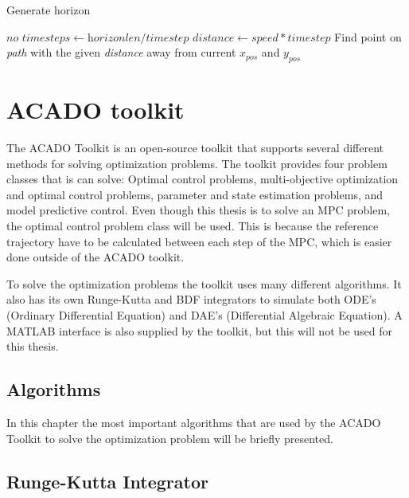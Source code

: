 \begin{algorithm}
\caption{Generate horizon}
\label{alg:genHor}
\begin{algorithmic}
	\State $\textit{no timesteps} \gets \textit{horizonlen}/\textit{timestep}$
	\State $\textit{distance} \gets \textit{speed} * \textit{timestep}$
		Find point on \textit{path} with the given \textit{distance} away from current \textit{$x_{pos}$} and \textit{$y_{pos}$}
	\EndFor
\EndProcedure
\end{algorithmic}
\end{algorithm}


\section{ACADO toolkit}

The ACADO Toolkit is an open-source toolkit that supports several different methods for solving optimization problems. The toolkit provides four problem classes that is can solve: Optimal control problems, multi-objective optimization and optimal control problems, parameter and state estimation problems, and model predictive control. Even though this thesis is to solve an MPC problem, the optimal control problem class will be used. This is because the reference trajectory have to be calculated between each step of the MPC, which is easier done outside of the ACADO toolkit.

To solve the optimization problems the toolkit uses many different algorithms. It also has its own Runge-Kutta and BDF integrators to simulate both ODE's (Ordinary Differential Equation) and DAE's (Differential Algebraic Equation). A MATLAB interface is also supplied by the toolkit, but this will not be used for this thesis.


\subsection{Algorithms}

In this chapter the most important algorithms that are used by the ACADO Toolkit to solve the optimization problem will be briefly presented.


\subsection{Runge-Kutta Integrator}
